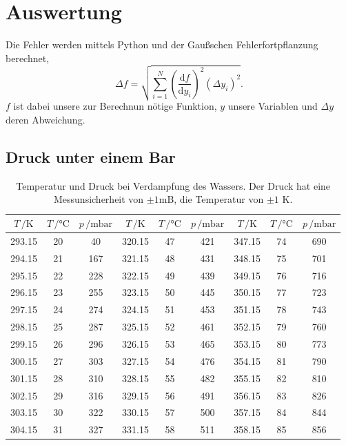 \section{Auswertung}
\label{sec:Auswertung}
Die Fehler werden mittels Python und der Gaußschen Fehlerfortpflanzung berechnet,
\begin{equation}
\Delta f=\sqrt{\sum_{i=1}^N\left(\frac{\text{d}f}{\text{d}y_i}\right)^2(\Delta y_i)^2}.
\label{eq:Gauß}
\end{equation}
$f$ ist dabei unsere zur Berechnun nötige Funktion, $y$ unsere Variablen und $\Delta y$ deren Abweichung.
\subsection{Druck unter einem Bar}
\begin{table}
  \centering
  \caption{Temperatur und Druck bei Verdampfung des Wassers. Der Druck hat eine Messunsicherheit von
  $\pm1$mB, die Temperatur von $\pm 1$ K.}
  \label{tab:Messreihe_1}
  \begin{tabular}{
  c c c||c c c||c c c
}
\toprule 
$T\,/ \unit{\kelvin}$ & $T\,/ \unit{\celsius}$ & $p\,/ \text{mbar}$ &
$T\,/ \unit{\kelvin}$ & $T\,/ \unit{\celsius}$ & $p\,/ \text{mbar}$ &
$T\,/ \unit{\kelvin}$ & $T\,/ \unit{\celsius}$ & $p\,/ \text{mbar}$ \\
\midrule
293.15 & 20 & 40  & 320.15 & 47 & 421 & 347.15 & 74 & 690 \\
294.15 & 21 & 167 & 321.15 & 48 & 431 & 348.15 & 75 & 701 \\    
295.15 & 22 & 228 & 322.15 & 49 & 439 & 349.15 & 76 & 716 \\                      
296.15 & 23 & 255 & 323.15 & 50 & 445 & 350.15 & 77 & 723 \\      
297.15 & 24 & 274 & 324.15 & 51 & 453 & 351.15 & 78 & 743 \\      
298.15 & 25 & 287 & 325.15 & 52 & 461 & 352.15 & 79 & 760 \\      
299.15 & 26 & 296 & 326.15 & 53 & 465 & 353.15 & 80 & 773 \\      
300.15 & 27 & 303 & 327.15 & 54 & 476 & 354.15 & 81 & 790 \\     
301.15 & 28 & 310 & 328.15 & 55 & 482 & 355.15 & 82 & 810 \\  
302.15 & 29 & 316 & 329.15 & 56 & 491 & 356.15 & 83 & 826 \\  
303.15 & 30 & 322 & 330.15 & 57 & 500 & 357.15 & 84 & 844 \\
304.15 & 31 & 327 & 331.15 & 58 & 511 & 358.15 & 85 & 856 \\

\end{tabular}
\end{table}
